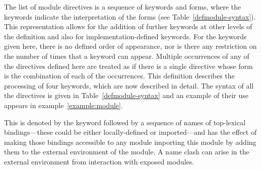\label{directives}
%
\begin{optDefinition}
The list of module directives is a sequence of keywords and forms, where the
keywords indicate the interpretation of the forms (see
Table~\ref{defmodule-syntax}).  This representation allows for the addition of
further keywords at other levels of the definition and also for
implementation-defined keywords.  For the keywords given here, there is no defined order of
appearance, nor is there any restriction on the number of times that a keyword
can appear.  Multiple occurrences of any of the directives defined here are
treated as if there is a single directive whose form is the combination of each
of the occurrences.  This definition describes the processing of four keywords,
which are now described in detail.  The syntax of all the directives is given in
Table~\ref{defmodule-syntax} and an example of their use appears in
example~\ref{example:module}.
\end{optDefinition}
%
%
\begin{optDefinition}
This is denoted by the keyword  followed by a sequence of
names of top-lexical bindings---these could be either locally-defined or
imported---and has the effect of making those bindings accessible to any module
importing this module by adding them to the external environment of the module.
A name clash can arise in the external environment from interaction with exposed
modules.
\end{optDefinition}
%
%
\label{import}
%
